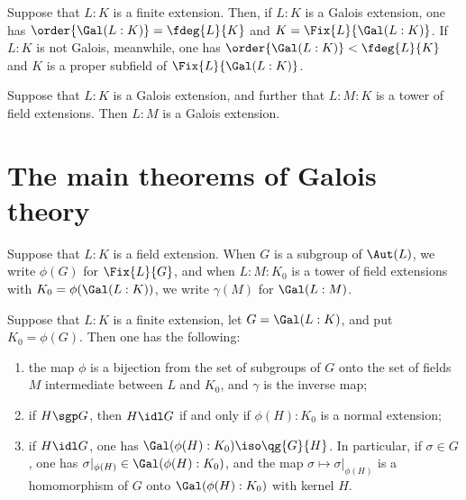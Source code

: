 \documentclass[a4paper]{article}
\begin{document}
\begin{ttheorem}
  Suppose that \( L:K \) is a finite extension.
  Then, if \( L:K \) is a Galois extension, one has \( \order{\Gal(L:K)}=\fdeg{L}{K} \) and \( K=\Fix{L}{\Gal(L:K)} \).
  If \( L:K \) is not Galois, meanwhile, one has \( \order{\Gal(L:K)}<\fdeg{L}{K} \) and \( K \) is a proper subfield of \( \Fix{L}{\Gal(L:K)} \).
\end{ttheorem}

\begin{tproposition}
  Suppose that \( L:K \) is a Galois extension, and further that \( L:M:K \) is a tower of field extensions.
  Then \( L:M \) is a Galois extension.
\end{tproposition}

\section{The main theorems of Galois theory}
\begin{tdefinition}
  Suppose that \( L:K \) is a field extension.
  When \( G \) is a subgroup of \( \Aut(L) \), we write \( \phi(G) \) for \( \Fix{L}{G} \), and when \( L:M:K_0 \) is a tower of field extensions with \( K_0=\phi(\Gal(L:K)) \), we write \( \gamma(M) \) for \( \Gal(L:M) \).
\end{tdefinition}

\begin{ttheorem}
  Suppose that \( L:K \) is a finite extension, let \( G=\Gal(L:K) \), and put \( K_0=\phi(G) \).
  Then one has the following: \begin{enumerate}[label=(\alph*)]
    \item the map \( \phi \) is a bijection from the set of subgroups of \( G \) onto the set of fields \( M \) intermediate between \( L \) and \( K_0 \), and \( \gamma \) is the inverse map;
    \item if \( H \sgp G \), then \( H\idl G \) if and only if \( \phi(H):K_0 \) is a normal extension;
    \item if \( H\idl G \), one has \( \Gal(\phi(H):K_0) \iso \qg{G}{H} \).
      In particular, if \( \sigma\in G \), one has \( \sigma|_{\phi(H)} \in \Gal(\phi(H):K_0) \), and the map \( \sigma\mapsto\sigma|_{\phi(H)} \) is a homomorphism of \( G \) onto \( \Gal(\phi(H):K_0) \) with kernel \( H \).
  \end{enumerate}
\end{ttheorem}
\end{document}
